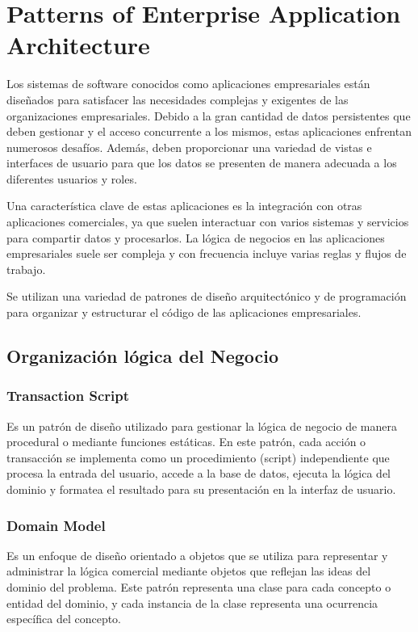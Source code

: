 \documentclass{article}
\begin{document}
		
		
		
		\section{Patterns of Enterprise Application Architecture}
		Los sistemas de software conocidos como aplicaciones empresariales están diseñados para satisfacer las necesidades complejas y exigentes de las organizaciones empresariales. Debido a la gran cantidad de datos persistentes que deben gestionar y el acceso concurrente a los mismos, estas aplicaciones enfrentan numerosos desafíos. Además, deben proporcionar una variedad de vistas e interfaces de usuario para que los datos se presenten de manera adecuada a los diferentes usuarios y roles.
		
		Una característica clave de estas aplicaciones es la integración con otras aplicaciones comerciales, ya que suelen interactuar con varios sistemas y servicios para compartir datos y procesarlos. La lógica de negocios en las aplicaciones empresariales suele ser compleja y con frecuencia incluye varias reglas y flujos de trabajo.
		
		Se utilizan una variedad de patrones de diseño arquitectónico y de programación para organizar y estructurar el código de las aplicaciones empresariales. 
		
		\subsection{Organización lógica del Negocio}\label{sec:orga_logica_negocios}
		\subsubsection{Transaction Script}
		Es un patrón de diseño utilizado para gestionar la lógica de negocio de manera procedural o mediante funciones estáticas. En este patrón, cada acción o transacción se implementa como un procedimiento (script) independiente que procesa la entrada del usuario, accede a la base de datos, ejecuta la lógica del dominio y formatea el resultado para su presentación en la interfaz de usuario.
		\subsubsection{Domain Model}
		Es un enfoque de diseño orientado a objetos que se utiliza para representar y administrar la lógica comercial mediante objetos que reflejan las ideas del dominio del problema. Este patrón representa una clase para cada concepto o entidad del dominio, y cada instancia de la clase representa una ocurrencia específica del concepto.
		
\end{document}
